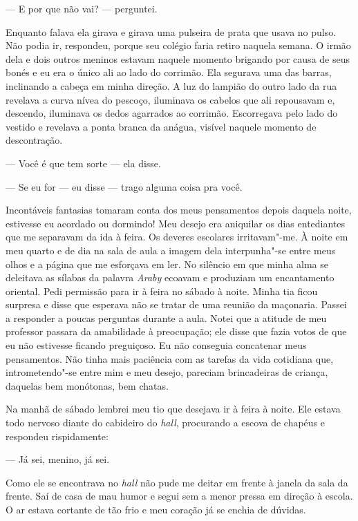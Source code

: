 --- E por que não vai? --- perguntei.

Enquanto falava ela girava e girava uma pulseira de prata que usava no
pulso.  Não podia ir, respondeu, porque seu colégio faria retiro naquela
semana.  O irmão dela e dois outros meninos estavam naquele momento brigando
por causa de seus bonés e eu era o único ali ao lado do corrimão.  Ela segurava
uma das barras, inclinando a cabeça em minha direção.  A luz do lampião do
outro lado da rua revelava a curva nívea do pescoço, iluminava os cabelos que
ali repousavam e, descendo, iluminava os dedos agarrados ao corrimão.
Escorregava pelo lado do vestido e revelava a ponta branca da anágua, visível
naquele momento de descontração.

--- Você é que tem sorte --- ela disse.

--- Se eu for --- eu disse --- trago alguma coisa pra você.

Incontáveis fantasias tomaram conta dos meus pensamentos depois daquela noite,
estivesse eu acordado ou dormindo!  Meu desejo era aniquilar os dias
entediantes que me separavam da ida à feira.  Os deveres escolares
irritavam"-me.  À noite em meu quarto e de dia na sala de aula a imagem dela
interpunha"-se entre meus olhos e a página que me esforçava em ler.  No silêncio
em que minha alma se deleitava as sílabas da palavra \textit{Araby} ecoavam e
produziam um encantamento oriental.  Pedi permissão para ir à feira no sábado à
noite.  Minha tia ficou surpresa e disse que esperava não se tratar de uma
reunião da maçonaria.  Passei a responder a poucas perguntas durante a aula.
Notei que a atitude de meu professor passara da amabilidade à preocupação; ele
disse que fazia votos de que eu não estivesse ficando preguiçoso.  Eu não
conseguia concatenar meus pensamentos.  Não tinha mais paciência com as tarefas
da vida cotidiana que, intrometendo"-se entre mim e meu desejo, pareciam
brincadeiras de criança, daquelas bem monótonas, bem chatas.

Na manhã de sábado lembrei meu tio que desejava ir à feira à noite.  Ele estava
todo nervoso diante do cabideiro do \textit{hall}, procurando a escova de
chapéus e respondeu rispidamente:

--- Já sei, menino, já sei.

Como ele se encontrava no \textit{hall} não pude me deitar em frente à janela
da sala da frente.  Saí de casa de mau humor e segui sem a menor pressa em
direção à escola.  O ar estava cortante de tão frio e meu coração já se enchia
de dúvidas.

